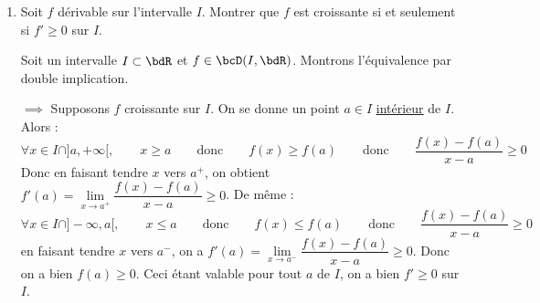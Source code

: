 \documentclass[a4paper,french,bookmarks]{article}
\begin{document}
\begin{enumerate}
{\begin{corollary}{Inégalité des accroissements finis}{IAF}
            \[ \hg{\forall (m, M) \in \bdR^2,\qquad \forall x \in ]a, b[,\qquad m \leq f'(x) \leq M \implies m(b - a) \leq f(b) - f(a) \leq M(b-a)}\]
        \end{corollary}
    }
	\yesafter
	\begin{nproof}
        Soient $(a, b) \in \bdR^2$ tels que $a < b$ et $f \in \bcC([a, b], \bdR) \cap \bcD(]a, b[, \bdR)$, ainsi que $(m, M) \in \bdR^2$ tels que $\forall x \in ]a, b[$, $m \leq f'(x) \leq M$. On applique alors le , d'où :
        \[ \exists c \in ]a, b[,\qquad f(b) - f(a) = (b-a)f'(c) \]
        Or $m \leq f'(c) \leq M$, de plus $b - a \geq 0$, donc on a $m(b-a) \leq (b-a)f'(c) \leq M(b-a)$. Finalement on a donc $m(b-a) \leq f(b) - f(a) \leq M(b-a)$.
	\end{nproof}
	\yesbefore
    
    \item Soit $f$ dérivable sur l’intervalle $I$. Montrer que $f$ est croissante si et seulement si $f' \geq 0$ sur $I$.
    
    \noafter
    \nobefore\yesafter
    \begin{nproof}
        Soit un intervalle $I \subset \bdR$ et $f \in \bcD(I, \bdR)$. Montrons l'équivalence par double implication.
            
        \begin{enumerate}
            \ithand $\boxed{\implies}$ Supposons $f$ croissante sur $I$. On se donne un point $a \in I$ \underline{intérieur} de $I$. Alors :
            \[ \forall x \in I \cap ]a, +\infty[,\qquad x \geq a \qquad\text{donc}\qquad f(x) \geq f(a) \qquad\text{donc}\qquad \dfrac{f(x)-f(a)}{x-a} \geq 0\]
            Donc en faisant tendre $x$ vers $a^+$, on obtient $f'(a) = \lim\limits_{x \to a^+} \dfrac{f(x)-f(a)}{x-a} \geq 0$. De même :
            \[ \forall x \in I \cap ]-\infty, a[,\qquad x \leq a \qquad\text{donc}\qquad f(x) \leq f(a) \qquad\text{donc}\qquad \dfrac{f(x)-f(a)}{x-a} \geq 0\]
            en faisant tendre $x$ vers $a^-$, on a $f'(a) = \lim\limits_{x \to a^-} \dfrac{f(x)-f(a)}{x-a} \geq 0$. Donc on a bien $f(a) \geq 0$. Ceci étant valable pour tout $a$ de $I$, on a bien $f' \geq 0$ sur $I$.
                

\end{enumerate}
\end{nproof}
\end{enumerate}
\end{document}
